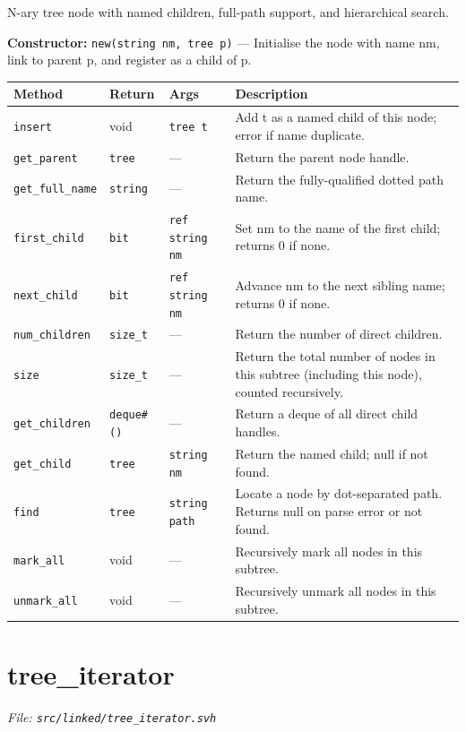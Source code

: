 \documentclass[11pt,letterpaper]{report}
\begin{document}
N-ary tree node with named children, full-path support, and hierarchical search.

\noindent\textbf{Constructor:} \texttt{new(string nm, tree p)} --- Initialise the node with name nm, link to parent p, and register as a child of p.

\begin{xltabular}{\linewidth}{>{\small}p{1.35in} >{\small}p{1.25in} >{\small}p{0.95in} >{\small}X}
\toprule
\textbf{Method} & \textbf{Return} & \textbf{Args} & \textbf{Description} \\
\midrule
\endhead
\bottomrule
\endfoot
\texttt{insert} & void & \texttt{tree t} & Add t as a named child of this node; error if name duplicate. \\
\texttt{get\_parent} & \texttt{tree} & --- & Return the parent node handle. \\
\texttt{get\_full\_name} & \texttt{string} & --- & Return the fully-qualified dotted path name. \\
\texttt{first\_child} & \texttt{bit} & \texttt{ref string nm} & Set nm to the name of the first child; returns 0 if none. \\
\texttt{next\_child} & \texttt{bit} & \texttt{ref string nm} & Advance nm to the next sibling name; returns 0 if none. \\
\texttt{num\_children} & \texttt{size\_t} & --- & Return the number of direct children. \\
\texttt{size} & \texttt{size\_t} & --- & Return the total number of nodes in this subtree (including this node), counted recursively. \\
\texttt{get\_children} & \texttt{deque\#()} & --- & Return a deque of all direct child handles. \\
\texttt{get\_child} & \texttt{tree} & \texttt{string nm} & Return the named child; null if not found. \\
\texttt{find} & \texttt{tree} & \texttt{string path} & Locate a node by dot-separated path. Returns null on parse error or not found. \\
\texttt{mark\_all} & void & --- & Recursively mark all nodes in this subtree. \\
\texttt{unmark\_all} & void & --- & Recursively unmark all nodes in this subtree. \\
\end{xltabular}

\section{tree\_iterator}
\noindent\small\textit{File: \texttt{src/linked/tree\_iterator.svh}}\par
\end{document}
